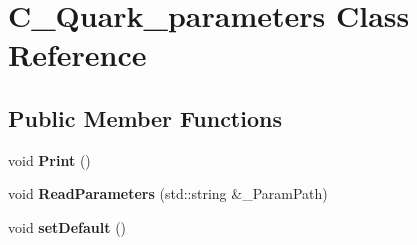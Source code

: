 \hypertarget{class_c___quark__parameters}{\section{C\-\_\-\-Quark\-\_\-parameters Class Reference}
\label{class_c___quark__parameters}
}
\subsection*{Public Member Functions}
\begin{DoxyCompactItemize}
\item 
\hypertarget{class_c___quark__parameters_a51327f6c5d89e2ab511cf2f7e59428bc}{void {\bfseries Print} ()}\label{class_c___quark__parameters_a51327f6c5d89e2ab511cf2f7e59428bc}

\item 
\hypertarget{class_c___quark__parameters_a9281fabcec668955ee7a2edfb1789b6b}{void {\bfseries Read\-Parameters} (std\-::string \&\-\_\-\-Param\-Path)}\label{class_c___quark__parameters_a9281fabcec668955ee7a2edfb1789b6b}

\item 
\hypertarget{class_c___quark__parameters_aa4d30bbbbfceeff0e5eac01f979139ea}{void {\bfseries set\-Default} ()}\label{class_c___quark__parameters_aa4d30bbbbfceeff0e5eac01f979139ea}

\end{DoxyCompactItemize}
